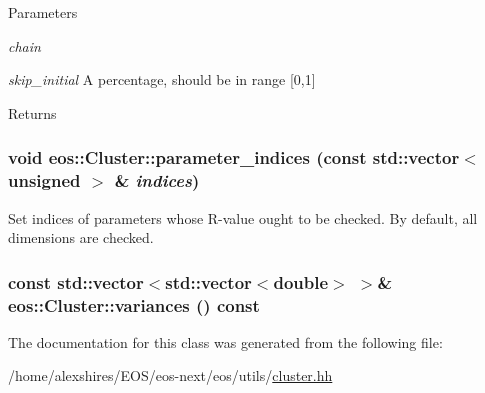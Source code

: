 \begin{DoxyParams}{Parameters}
\item[{\em chain}]\item[{\em skip\_\-initial}]A percentage, should be in range \mbox{[}0,1\mbox{]} \end{DoxyParams}
\begin{DoxyReturn}{Returns}

\end{DoxyReturn}
\hypertarget{classeos_1_1Cluster_a2906631fc892844e19b661d1484a6a71}{
\subsubsection[{parameter\_\-indices}]{\setlength{\rightskip}{0pt plus 5cm}void eos::Cluster::parameter\_\-indices (const std::vector$<$ unsigned $>$ \& {\em indices})}}
\label{classeos_1_1Cluster_a2906631fc892844e19b661d1484a6a71}
Set indices of parameters whose R-\/value ought to be checked. By default, all dimensions are checked. \hypertarget{classeos_1_1Cluster_a16f6b0f61e014b2d89ca532d0bc04cf1}{
\subsubsection[{variances}]{\setlength{\rightskip}{0pt plus 5cm}const std::vector$<$std::vector$<$double$>$ $>$\& eos::Cluster::variances () const}}
\label{classeos_1_1Cluster_a16f6b0f61e014b2d89ca532d0bc04cf1}


The documentation for this class was generated from the following file:\begin{DoxyCompactItemize}
\item 
/home/alexshires/EOS/eos-\/next/eos/utils/\hyperlink{cluster_8hh}{cluster.hh}\end{DoxyCompactItemize}
